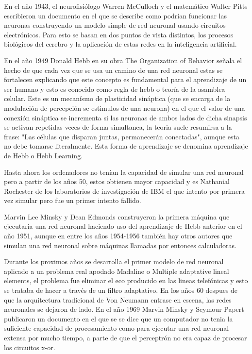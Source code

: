 \documentclass[a4paper, 11pt]{article} %
\begin{document}
En el año 1943, el neurofisiólogo Warren McCulloch y el matemático Walter Pitts escribieron un documento en el que se describe como podrían funcionar las neuronas construyendo un modelo simple de red neuronal usando circuitos electrónicos. Para esto se basan en dos puntos de vista distintos, los procesos biológicos del cerebro y la aplicación de estas redes en la inteligencia artificial.

En el año 1949 Donald Hebb en su obra The Organization of Behavior señala el hecho de que cada vez que se usa un camino de una red neuronal estas se fortalecen explicando que este concepto es fundamental para el aprendizaje de un ser humano y esto es conocido como regla de hebb o teoría de la asamblea celular. Este es un mecanísmo de plasticidad sináptica (que se encarga de la modulación de percepción se estimulos de una neurona) en el que el valor de una conexión sináptica se incrementa si las neuronas de ambos lados de dicha sinapsis se activan repetidas veces de forma simultanea, la teoria suele resumirsa a la frase: "Las células que disparan juntas, permanecerán conectadas", aunque esta no debe tomarse literalmente. Esta forma de aprendizaje se denomina aprendizaje de Hebb o Hebb Learning.

Hasta ahora los ordenadores no tenían la capacidad de simular una red neuronal pero a partir de los años 50, estos obtienen mayor capacidad y es Nathanial Rochester de los laboratorios de investigación de IBM el que intento por primera vez simular pero fue un primer intento fallido.

Marvin Lee Minsky y Dean Edmonds construyeron la primera máquina que ejecutaria una red neuronal haciendo uso del aprendizaje de Hebb anterior en el año 1951, aunque en entre los años 1954-1956 también hay otros autores que simulan una red neuronal sobre máquinas llamadas por entonces calculadoras.

Durante los proximos años se desarrolla el primer modelo de red neuronal aplicado a un problema real apodado Madaline o Multiple adaptative lineal elements, el problema fue eliminar el eco producido en las lineas telefónicas y esto se trataba de hacer a través de un filtro adaptativo. En los años 60 despues de que la arquitectura tradicional de Von Neumann entrase en escena, las redes neuronales
se dejaron de lado. En el año 1969 Marvin Minsky y Seymour Papert publicaron un documento en el que se se dice que un computador no tenia la suficiente capacidad de procesamiento como para ejecutar una red neuronal extensa por mucho tiempo, a parte de que el perceptrón no era capaz de procesar los circuitos x-or.
\end{document}
